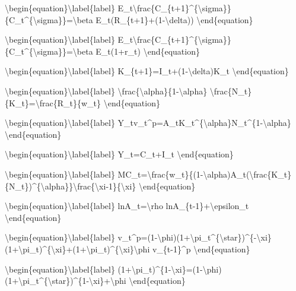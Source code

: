 \documentclass[10pt,math=newtx,citestyle=gb7714-2015,bibstyle=gb7714-2015]{elegantbook}
\begin{document}
	\textbackslash{}begin\{equation\}\textbackslash{}label\{label\}
	E\_t\textbackslash{}frac\{C\_\{t+1\}\^{}\{\textbackslash{}sigma\}\}\{C\_t\^{}\{\textbackslash{}sigma\}\}=\textbackslash{}beta E\_t(R\_\{t+1\}+(1-\textbackslash{}delta))
	\textbackslash{}end\{equation\}
	
	\textbackslash{}begin\{equation\}\textbackslash{}label\{label\}
	E\_t\textbackslash{}frac\{C\_\{t+1\}\^{}\{\textbackslash{}sigma\}\}\{C\_t\^{}\{\textbackslash{}sigma\}\}=\textbackslash{}beta E\_t(1+r\_t)
	\textbackslash{}end\{equation\}
	
	\textbackslash{}begin\{equation\}\textbackslash{}label\{label\}
	K\_\{t+1\}=I\_t+(1-\textbackslash{}delta)K\_t
	\textbackslash{}end\{equation\}
	
	\textbackslash{}begin\{equation\}\textbackslash{}label\{label\}
	\textbackslash{}frac\{\textbackslash{}alpha\}\{1-\textbackslash{}alpha\} \textbackslash{}frac\{N\_t\}\{K\_t\}=\textbackslash{}frac\{R\_t\}\{w\_t\}
	\textbackslash{}end\{equation\}
	
	\textbackslash{}begin\{equation\}\textbackslash{}label\{label\}
	Y\_tv\_t\^{}p=A\_tK\_t\^{}\{\textbackslash{}alpha\}N\_t\^{}\{1-\textbackslash{}alpha\}
	\textbackslash{}end\{equation\}
	
	\textbackslash{}begin\{equation\}\textbackslash{}label\{label\}
	Y\_t=C\_t+I\_t
	\textbackslash{}end\{equation\}
	
	\textbackslash{}begin\{equation\}\textbackslash{}label\{label\}
	MC\_t=\textbackslash{}frac\{w\_t\}\{(1-\textbackslash{}alpha)A\_t(\textbackslash{}frac\{K\_t\}\{N\_t\})\^{}\{\textbackslash{}alpha\}\}\textbackslash{}frac\{\textbackslash{}xi-1\}\{\textbackslash{}xi\}
	\textbackslash{}end\{equation\}
	
	\textbackslash{}begin\{equation\}\textbackslash{}label\{label\}
	lnA\_t=\textbackslash{}rho lnA\_\{t-1\}+\textbackslash{}epsilon\_t
	\textbackslash{}end\{equation\}
	
	\textbackslash{}begin\{equation\}\textbackslash{}label\{label\}
	v\_t\^{}p=(1-\textbackslash{}phi)(1+\textbackslash{}pi\_t\^{}\{\textbackslash{}star\})\^{}\{-\textbackslash{}xi\}(1+\textbackslash{}pi\_t)\^{}\{\textbackslash{}xi\}+(1+\textbackslash{}pi\_t)\^{}\{\textbackslash{}xi\}\textbackslash{}phi v\_\{t-1\}\^{}p
	\textbackslash{}end\{equation\}
	
	\textbackslash{}begin\{equation\}\textbackslash{}label\{label\}
	(1+\textbackslash{}pi\_t)\^{}\{1-\textbackslash{}xi\}=(1-\textbackslash{}phi)(1+\textbackslash{}pi\_t\^{}\{\textbackslash{}star\})\^{}\{1-\textbackslash{}xi\}+\textbackslash{}phi
	\textbackslash{}end\{equation\}
	
\end{document}
